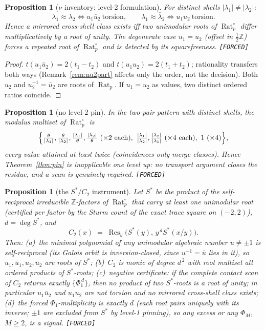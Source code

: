 \documentclass[11pt]{article}
\newcommand{\F}{\textnormal{\texttt{[FORCED]}}}
\newcommand{\Z}{\mathbb{Z}}
\newcommand{\Rat}{\operatorname{Rat}}
\newcommand{\Res}{\operatorname{Res}}
\newtheorem{proposition}[theorem]{Proposition}
\theoremstyle{definition}
\begin{document}
\begin{proposition}[$\nu$ inventory; level-2 formulation]\label{prop:nuinv}
For distinct shells $|\lambda_1|\neq|\lambda_2|$:
\[
\lambda_1\approx\lambda_2\iff u_1\bar u_2\ \text{torsion},\qquad
\lambda_1\approx\bar\lambda_2\iff u_1u_2\ \text{torsion}.
\]
Hence a mirrored cross-shell class exists iff two unimodular roots of
$\Rat_p^{\circ}$ differ multiplicatively by a root of unity. The degenerate
case $u_1=u_2$ (offset in $\tfrac12\Z$) forces a repeated root of
$\Rat_p^{\circ}$ and is detected by its squarefreeness. \F
\end{proposition}

\begin{proof}
$t(u_1\bar u_2)=2(t_1-t_2)$ and $t(u_1u_2)=2(t_1+t_2)$; rationality transfers
both ways (Remark~\ref{rem:nu2part} affects only the order, not the decision).
Both $u_2$ and $u_2^{-1}=\bar u_2$ are roots of $\Rat_p$. If $u_1=u_2$ as
values, two distinct ordered ratios coincide.
\end{proof}

\begin{proposition}[no level-2 pin]\label{prop:nopin}
In the two-pair pattern with distinct shells, the modulus multiset of
$\Rat_p^{\circ}$ is
\[
\Bigl\{\tfrac{\theta}{|\lambda_1|},\tfrac{\theta}{|\lambda_2|},
\tfrac{|\lambda_1|}{\theta},\tfrac{|\lambda_2|}{\theta}\ (\times2\ \text{each}),\
\tfrac{|\lambda_1|}{|\lambda_2|},\tfrac{|\lambda_2|}{|\lambda_1|}\ (\times4\ \text{each}),\
1\ (\times4)\Bigr\},
\]
every value attained at least twice (coincidences only merge classes). Hence
Theorem~\ref{thm:pin} is inapplicable one level up: no transport argument closes
the residue, and a scan is genuinely required. \F
\end{proposition}

\begin{proposition}[the $S^{*}/C_2$ instrument]\label{prop:c2}
Let $S^{*}$ be the product of the self-reciprocal irreducible $\Z$-factors of
$\Rat_p^{\circ}$ that carry at least one unimodular root (certified per factor
by the Sturm count of the exact trace square on $(-2,2)$), $d=\deg S^{*}$, and
\[
C_2(x)\;=\;\Res_y\bigl(S^{*}(y),\,y^{\,d}S^{*}(x/y)\bigr).
\]
Then: (a)~the minimal polynomial of any unimodular algebraic number $u\neq\pm1$
is self-reciprocal (its Galois orbit is inversion-closed, since
$u^{-1}=\bar u$ lies in it), so $u_1,\bar u_1,u_2,\bar u_2$ are roots of
$S^{*}$; (b)~$C_2$ is monic of degree $d^{\,2}$ with root multiset all ordered
products of $S^{*}$-roots; (c)~\emph{negative certificate}: if the complete
contact scan of $C_2$ returns exactly $\{\Phi_1^{\,d}\}$, then no product of two
$S^{*}$-roots is a root of unity; in particular $u_1\bar u_2$ and $u_1u_2$ are
not torsion and no mirrored cross-shell class exists; (d)~the forced
$\Phi_1$-multiplicity is exactly $d$ (each root pairs uniquely with its inverse;
$\pm1$ are excluded from $S^{*}$ by level-1 pinning), so any excess or any
$\Phi_M$, $M\ge2$, is a signal. \F
\end{proposition}
\end{document}
